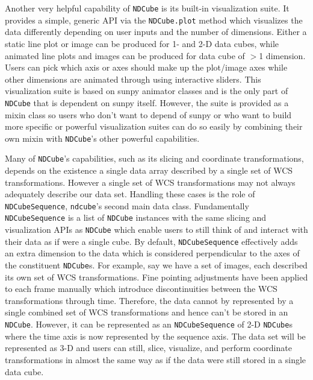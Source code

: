 Another very helpful capability of \texttt{NDCube} is its built-in visualization suite.  It provides a simple, generic API via the \texttt{NDCube.plot} method which visualizes the data differently depending on user inputs and the number of dimensions.  Either a static line plot or image can be produced for 1- and 2-D data cubes, while animated line plots and images can be produced for data cube of $>$1 dimension.  Users can pick which axis or axes should make up the plot/image axes while other dimensions are animated through using interactive sliders.  This visualization suite is based on sunpy animator classes and is the only part of \texttt{NDCube} that is dependent on sunpy itself.  However, the suite is provided as a mixin class so users who don't want to depend of sunpy or who want to build more specific or powerful visualization suites can do so easily by combining their own mixin with \texttt{NDCube}'s other powerful capabilities.

Many of \texttt{NDCube}'s capabilities, such as its slicing and coordinate transformations, depends on the existence a single data array described by a single set of WCS transformations.
However a single set of WCS transformations may not always adequately describe our data set.
Handling these cases is the role of \texttt{NDCubeSequence}, \texttt{ndcube}'s second main data class.
Fundamentally \texttt{NDCubeSequence} is a list of \texttt{NDCube} instances with the same slicing and visualization APIs as \texttt{NDCube} which enable users to still think of and interact with their data as if were a single cube.
By default, \texttt{NDCubeSequence} effectively adds an extra dimension to the data which is considered perpendicular to the axes of the constituent \texttt{NDCube}s.
For example, say we have a set of images, each described its own set of WCS transformations.
Fine pointing adjustments have been applied to each frame manually which introduce discontinuities between the WCS transformations through time.
Therefore, the data cannot by represented by a single combined set of WCS transformations and hence can't be stored in an \texttt{NDCube}.
However, it can be represented as an \texttt{NDCubeSequence} of 2-D \texttt{NDCube}s where the time axis is now represented by the sequence axis.
The data set will be represented as 3-D and users can still, slice, visualize, and perform coordinate transformations in almost the same way as if the data were still stored in a single data cube.

